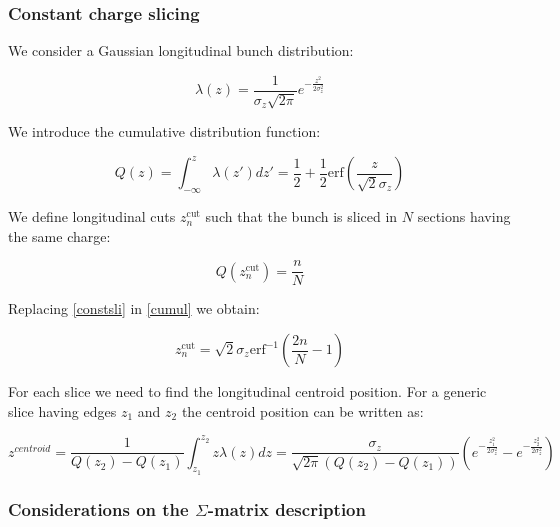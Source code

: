 
\subsubsection{Constant charge slicing}
\label{app:slicing}
We consider a Gaussian longitudinal bunch distribution:

\begin{equation}
\lambda(z) = \frac{1}{\sigma_z \sqrt{2\pi}}e^{-\frac{z^2}{2\sigma_z^2}} 
\end{equation}

We introduce the cumulative distribution function:

\begin{equation}
Q(z) = \int_{-\infty}^{z} \lambda(z')dz' = \frac{1}{2}+\frac{1}{2}\mathrm{erf}\left(\frac{z}{\sqrt{2}\sigma_z}\right)
\label{cumul}
\end{equation}

We define longitudinal cuts $z^{\mathrm{cut}}_n$ such that the bunch is sliced in $N$ sections having the same charge:

\begin{equation}
Q(z^{\mathrm{cut}}_n) = \frac{n}{N}
\label{constsli}
\end{equation}

Replacing \ref{constsli} in \ref{cumul} we obtain:

\begin{equation}
z^{\mathrm{cut}}_n = \sqrt{2} \sigma_z \mathrm{erf}^{-1}\left( \frac{2n}{N}-1\right)
\end{equation}

For each slice we need to find the longitudinal centroid position. For a generic slice having edges $z_1$ and $z_2$ the centroid position can be written as:

\begin{equation}
z^{centroid}= \frac{1}{Q(z_2) - Q(z_1)}\int_{z_1}^{z_2} z \lambda(z)dz = \frac{\sigma_z}{\sqrt{2\pi}\left(Q(z_2) - Q(z_1)\right)}\left(e^{-\frac{z_1^2}{2\sigma_z^2}}-e^{-\frac{z_2^2}{2\sigma_z^2}}\right)
\end{equation}

\subsubsection{Considerations on the $\Sigma$-matrix description}
\label{app:sigma}

